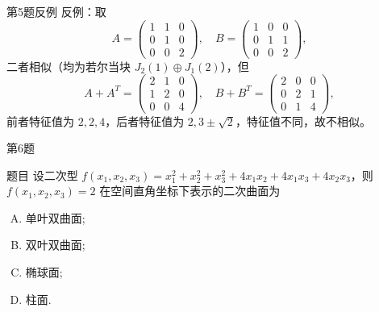 \documentclass[aspectratio=169]{beamer}
\begin{document}
\begin{frame}{第5题反例}
反例：取
\[
A=\begin{pmatrix}1&1&0\\0&1&0\\0&0&2\end{pmatrix},\quad
B=\begin{pmatrix}1&0&0\\0&1&1\\0&0&2\end{pmatrix},
\]
二者相似（均为若尔当块 \(J_2(1)\oplus J_1(2)\)），但
\[
A+A^T=\begin{pmatrix}2&1&0\\1&2&0\\0&0&4\end{pmatrix},\quad
B+B^T=\begin{pmatrix}2&0&0\\0&2&1\\0&1&4\end{pmatrix},
\]
前者特征值为 \(2,2,4\)，后者特征值为 \(2,3\pm\sqrt{2}\)，特征值不同，故不相似。
\end{frame}

\begin{frame}{第6题}
\begin{block}{题目}
设二次型 \(f(x_{1}, x_{2}, x_{3})=x_{1}^{2}+x_{2}^{2}+x_{3}^{2}+4 x_{1} x_{2}+4 x_{1} x_{3}+4 x_{2} x_{3}\)，则 \(f(x_{1}, x_{2}, x_{3})=2\) 在空间直角坐标下表示的二次曲面为
\begin{enumerate}[A.]
\item 单叶双曲面;
\item 双叶双曲面;
\item 椭球面;
\item 柱面.
\end{enumerate}
\end{block}
\end{frame}
\end{document}
